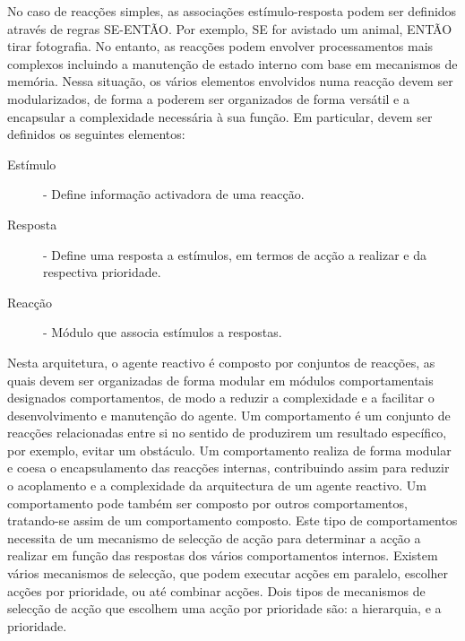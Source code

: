 \documentclass[a4paper,12pt]{article}
\begin{document}
No caso de reacções simples, as associações estímulo-resposta podem ser definidos através de regras SE-ENTÃO. Por exemplo, SE for avistado um animal, ENTÃO tirar fotografia.
No entanto, as reacções podem envolver processamentos mais complexos incluindo a manutenção de estado interno com base em mecanismos de memória. Nessa situação, os vários elementos envolvidos numa reacção devem ser modularizados, de forma a poderem ser organizados de forma versátil e a encapsular a complexidade necessária à sua função. Em particular, devem ser definidos os seguintes elementos:

\begin{description}
	\item[Estímulo] - Define informação activadora de uma reacção.
	\item[Resposta] - Define uma resposta a estímulos, em termos de acção a realizar e da respectiva prioridade.
	\item[Reacção] - Módulo que associa estímulos a respostas.
\end{description}

Nesta arquitetura, o agente reactivo é composto por conjuntos de reacções, as quais devem ser organizadas de forma modular em módulos comportamentais designados comportamentos, de modo a reduzir a complexidade e a facilitar o desenvolvimento e manutenção do agente. Um comportamento é um conjunto de reacções relacionadas entre si no sentido de produzirem um resultado específico, por exemplo, evitar um obstáculo.  Um comportamento realiza de forma modular e coesa o encapsulamento das reacções internas, contribuindo assim para reduzir o acoplamento e a complexidade da arquitectura de um agente reactivo.
Um comportamento pode também ser composto por outros comportamentos, tratando-se assim de um comportamento composto. Este tipo de comportamentos necessita de um mecanismo de selecção de acção para determinar a acção a realizar em função das respostas dos vários comportamentos internos.
Existem vários mecanismos de selecção, que podem executar acções em paralelo, escolher acções por prioridade, ou até combinar acções. Dois tipos de mecanismos de selecção de acção que escolhem uma acção por prioridade são: a hierarquia, e a prioridade.
\end{document}
